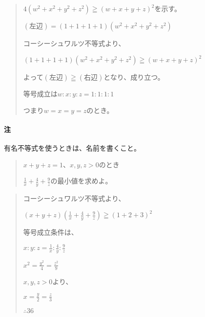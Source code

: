 \documentclass[uplatex,fleqn]{jsbook}
\begin{document}
\begin{quote}
    $4(w^2+x^2+y^2+z^2)\geqq (w+x+y+z)^2$を示す。

    $(\text{左辺})=(1+1+1+1)(w^2+x^2+y^2+z^2)$

    コーシーシュワルツ不等式より、

    $(1+1+1+1)(w^2+x^2+y^2+z^2)\geqq (w+x+y+z)^2$

    よって$(\text{左辺})\geqq (右辺)$となり、成り立つ。

    等号成立は$w:x:y:z=1:1:1:1$

    つまり$w=x=y=z$のとき。
\end{quote}

\paragraph{注}有名不等式を使うときは、名前を書くこと。

\begin{quote}
    $x+y+z=1$、$x,y,z>0$のとき

    $\displaystyle \frac{1}{x}+\frac{4}{y}+\frac{9}{z}$の最小値を求めよ。
\end{quote}

\begin{quote}
    コーシーシュワルツ不等式より、

    $\displaystyle (x+y+z)(\frac{1}{x}+\frac{4}{y}+\frac{9}{z})\geqq (1+2+3)^2$

    等号成立条件は、

    $\displaystyle x:y:z=\frac{1}{x}:\frac{4}{y}:\frac{9}{z}$

    $x^2=\frac{y^2}{4}=\frac{z^2}{9}$

    $x,y,z>0$より、

    $x=\frac{y}{2}=\frac{z}{3}$

    $\therefore 36$
\end{quote}
\end{document}
